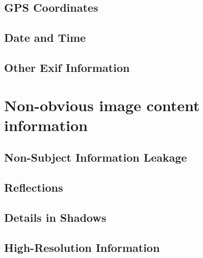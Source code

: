 \subsection{GPS Coordinates}
\subsection{Date and Time}
\subsection{Other Exif Information}

\section{Non-obvious image content information}
\subsection{Non-Subject Information Leakage}
\subsection{Reflections}
\subsection{Details in Shadows}
\subsection{High-Resolution Information}


